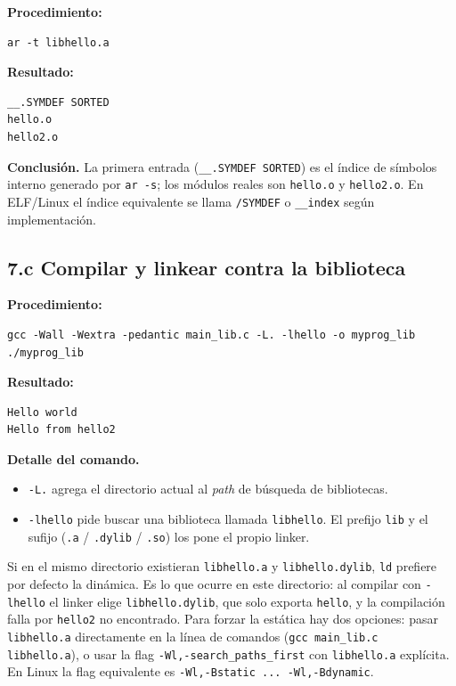 \documentclass[11pt,a4paper]{article}
\begin{document}
\textbf{Procedimiento:}

\begin{lstlisting}
ar -t libhello.a
\end{lstlisting}

\textbf{Resultado:}

\begin{lstlisting}[style=outstyle]
__.SYMDEF SORTED
hello.o
hello2.o
\end{lstlisting}

\textbf{Conclusión.} La primera entrada (\texttt{\_\_.SYMDEF SORTED})
es el índice de símbolos interno generado por \texttt{ar -s}; los
módulos reales son \texttt{hello.o} y \texttt{hello2.o}. En ELF/Linux
el índice equivalente se llama \texttt{/SYMDEF} o
\texttt{\_\_index} según implementación.

\subsection*{7.c Compilar y linkear contra la biblioteca}

\textbf{Procedimiento:}

\begin{lstlisting}
gcc -Wall -Wextra -pedantic main_lib.c -L. -lhello -o myprog_lib
./myprog_lib
\end{lstlisting}

\textbf{Resultado:}

\begin{lstlisting}[style=outstyle]
Hello world
Hello from hello2
\end{lstlisting}

\textbf{Detalle del comando.}
\begin{itemize}[leftmargin=*, itemsep=0pt]
    \item \texttt{-L.} agrega el directorio actual al \emph{path} de
        búsqueda de bibliotecas.
    \item \texttt{-lhello} pide buscar una biblioteca llamada
        \texttt{libhello}. El prefijo \texttt{lib} y el sufijo
        (\texttt{.a} / \texttt{.dylib} / \texttt{.so}) los pone el
        propio linker.
\end{itemize}

\begin{ojo}
Si en el mismo directorio existieran \texttt{libhello.a} y
\texttt{libhello.dylib}, \texttt{ld} prefiere por defecto la dinámica.
Es lo que ocurre en este directorio: al compilar con \texttt{-lhello}
el linker elige \texttt{libhello.dylib}, que solo exporta
\texttt{hello}, y la compilación falla por \texttt{hello2}
no encontrado. Para forzar la estática hay dos opciones: pasar
\texttt{libhello.a} directamente en la línea de comandos
(\texttt{gcc main\_lib.c libhello.a}), o usar la flag
\texttt{-Wl,-search\_paths\_first} con \texttt{libhello.a} explícita.
En Linux la flag equivalente es \texttt{-Wl,-Bstatic ... -Wl,-Bdynamic}.
\end{ojo}
\end{document}
